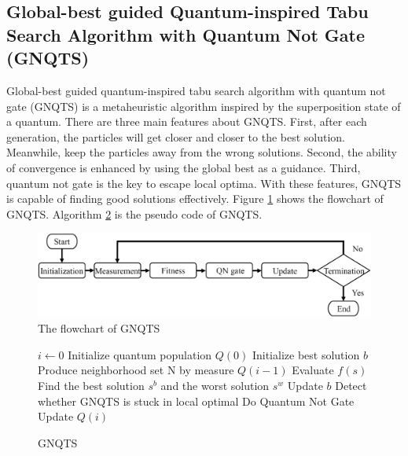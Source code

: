 \documentclass[../main.tex]{subfiles}
\begin{document}
\subsection{Global-best guided Quantum-inspired Tabu Search Algorithm with Quantum Not Gate (GNQTS)}

Global-best guided quantum-inspired tabu search algorithm with quantum not gate (GNQTS) is a metaheuristic algorithm inspired by the superposition state of a quantum. There are three main features about GNQTS. First, after each generation, the particles will get closer and closer to the best solution. Meanwhile, keep the particles away from the wrong solutions. Second, the ability of convergence is enhanced by using the global best as a guidance. Third, quantum not gate is the key to escape local optima. With these features, GNQTS is capable of finding good solutions effectively. Figure \ref{flow} shows the flowchart of GNQTS. Algorithm \ref{GN_pseudo} is the pseudo code of GNQTS.

\begin{figure}[H]
    \centering
    \includegraphics[scale = 0.4] {figure/flowChart.png}
    \caption{The flowchart of GNQTS}
    \label{flow}
\end{figure}

\begin{figure}[H]
    \centering
    \begin{minipage}{.6\linewidth}
        \begin{algorithm}[H]
            \caption{GNQTS}
            \label{GN_pseudo}
            \begin{algorithmic}[1]
                \State $i \leftarrow 0$
                \State Initialize quantum  population $Q(0)$
                \State Initialize best solution $b$
                \State Produce neighborhood set N by measure $Q(i-1)$
                \State Evaluate $f(s)$
                \State Find the best solution $s^b$ and the worst solution $s^w$
                \State Update $b$
                \State Detect whether GNQTS is stuck in local optimal
                \State Do Quantum Not Gate
                \EndIf
                \State Update $Q(i)$
                \EndWhile
            \end{algorithmic}
        \end{algorithm}
    \end{minipage}
\end{figure}
\end{document}
